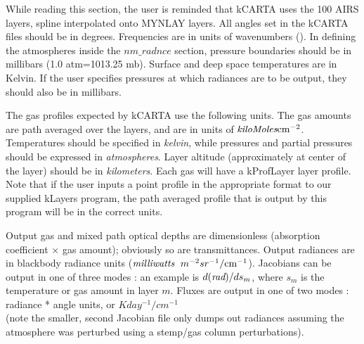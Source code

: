 \documentclass[12pt]{article}
\newcommand{\kc}{\textsf{kCARTA}\xspace}
\newcommand{\cm}{\hbox{cm}}
\begin{document}
While reading this section, the user is reminded that \kc uses the 100
AIRS layers, spline interpolated onto MYNLAY layers. All angles set in the 
\kc files should be in degrees.
Frequencies are in units of wavenumbers (\wn).  In defining the
atmospheres inside the $nm\_radnce$ section, pressure boundaries should be
in millibars (1.0 atm=1013.25 mb).  Surface and deep space temperatures
are in Kelvin.  If the user specifies pressures at which radiances are
to be output, they should also be in millibars.

The gas profiles expected by \kc use the following units.  The gas
amounts are path averaged over the layers, and are in units of
$\hbox{\em kiloMoles} \cm^{-2}$.  Temperatures should be
specified in {\em kelvin}, while pressures and partial pressures
should be expressed in {\em atmospheres}.  Layer altitude
(approximately at center of the layer) should be in {\em
kilometers}.  Each gas will have a kProfLayer layer profile.  Note that if
the user inputs a point profile in the appropriate format to our
supplied {\sf kLayers} program, the path averaged profile that is
output by this program will be in the correct units.

Output gas and mixed path optical depths are dimensionless (absorption
coefficient $\times$ gas amount); obviously so are transmittances.
Output radiances are in blackbody radiance units ($\hbox{\em milliwatts}
\;\ m^{-2} sr^{-1}/\cm^{-1}$).  Jacobians can be output in one of three
modes : an example is $d(\hbox{\em rad})/ds_{m}$, where $s_{m}$ is the
temperature or gas amount in layer $m$. Fluxes are output in one of two 
modes : radiance * angle units, or $K day^{-1} /cm^{-1}$\\
(note the smaller, second Jacobian file only dumps out radiances assuming the
atmosphere was perturbed using a stemp/gas column perturbations).
\end{document}
